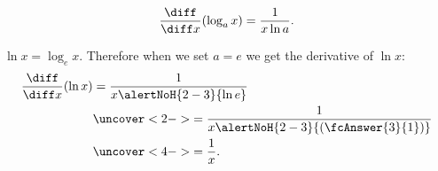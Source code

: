 \begin{frame}
\begin{theorem}
\[
\frac{\diff}{\diff x} (\log_a x) = \frac{1}{x\ln a} .
\]
\end{theorem}

$\ln x = \log_e x$. Therefore when we set $a = e$ we get the derivative of $\ln x$:
\begin{align*}
\frac{\diff}{\diff x}(\ln x) & = \frac{1}{x\alertNoH{ 2-3}{\ln e}} \\
 & \uncover<2->{= \frac{1}{x\alertNoH{2-3}{( \fcAnswer{3}{1}) }}} \\
 & \uncover<4->{= \frac{1}{x}.}
\end{align*}
%
\end{frame}
